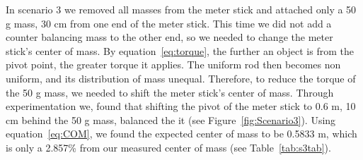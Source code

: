 In scenario 3 we removed all masses from the meter stick and attached only a 50 g mass, 30 cm from one end of the meter stick. This time we did not add a counter balancing mass to the other end, so we needed to change the meter stick's center of mass. By equation~\ref{eq:torque}, the further an object is from the pivot point, the greater torque it applies. The uniform rod then becomes non uniform, and its distribution of mass unequal. Therefore, to reduce the torque of the 50 g mass, we needed to shift the meter stick's center of mass. Through experimentation we, found that shifting the pivot of the meter stick to 0.6 m, 10 cm behind the 50 g mass, balanced the it (see Figure~\ref{fig:Scenario3}). Using equation~\ref{eq:COM}, we found the expected center of mass to be 0.5833 m, which is only a 2.857\%  from our measured center of mass (see Table~\ref{tab:s3tab}).
